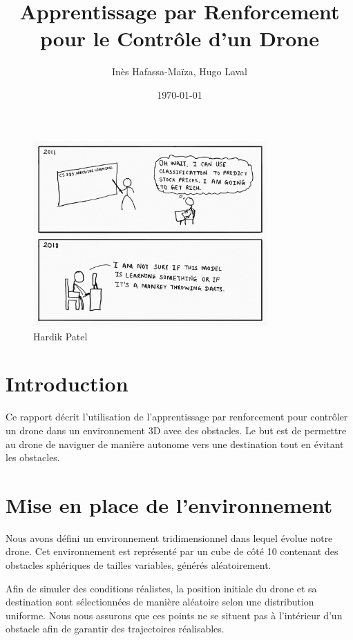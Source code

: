 \documentclass[a4paper, 12pt]{article}
\title{Apprentissage par Renforcement pour le Contrôle d'un Drone}
\author{Inès Hafassa-Maïza, Hugo Laval}
\date{\today}
\begin{document}
\maketitle



\begin{figure}[H]
    \centering
    \includegraphics[width=0.8\textwidth]{ml_class_sketch.jpg}
    \caption{Hardik Patel}
\end{figure}
\newpage
\tableofcontents
\newpage


\section{Introduction}
Ce rapport décrit l'utilisation de l'apprentissage par renforcement pour contrôler un drone dans un environnement 3D avec des obstacles. Le but est de permettre au drone de naviguer de manière autonome vers une destination tout en évitant les obstacles.

\section{Mise en place de l’environnement}

Nous avons défini un environnement tridimensionnel dans lequel évolue notre drone. Cet environnement est représenté par un cube de côté 10 contenant des obstacles sphériques de tailles variables, générés aléatoirement.

Afin de simuler des conditions réalistes, la position initiale du drone et sa destination sont sélectionnées de manière aléatoire selon une distribution uniforme. Nous nous assurons que ces points ne se situent pas à l’intérieur d’un obstacle afin de garantir des trajectoires réalisables.
\end{document}
